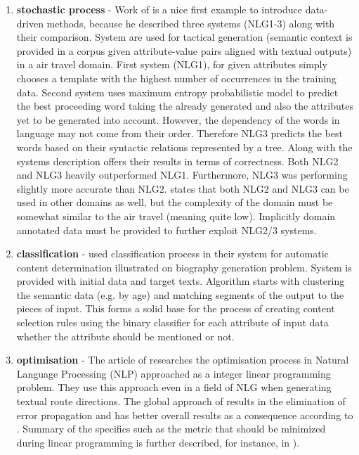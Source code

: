 \begin{enumerate}
	\item \textbf{stochastic process} - Work of \cite{ratnaparkhi2000trainable} is a nice first example to introduce data-driven methods, because he described three systems (NLG1-3) along with their comparison. System are used for tactical generation (semantic context is provided in a corpus given attribute-value pairs aligned with textual outputs) in a air travel domain. First system (NLG1), for given attributes simply chooses a template with the highest number of occurrences in the training data. Second system uses maximum entropy probabilistic model to predict the best proceeding  word taking the already generated and also the attributes yet to be generated into account. However, the dependency of the words in language may not come from their order. Therefore NLG3 predicts the best words based on their syntactic relations represented by a tree. Along with the systems description \cite{ratnaparkhi2000trainable} offers their results in terms of correctness. Both NLG2 and NLG3 heavily outperformed NLG1. Furthermore, NLG3 was performing slightly more accurate than NLG2.  \cite{ratnaparkhi2000trainable} states that both NLG2 and NLG3 can be used in other domains as well, but the complexity of the domain must be somewhat similar to the air travel (meaning quite low). Implicitly domain annotated data must be provided to further exploit NLG2/3 systems.\label{dd-1}
	\item \textbf{classification} - \cite{duboue2003statistical} used classification process in their system for automatic content determination illustrated on biography generation problem. System is provided with initial data and target texts. Algorithm starts with clustering the semantic data (e.g. by age) and matching segments of the output to the pieces of input. This forms a solid base for the process of creating content selection rules using the binary classifier for each attribute of input data whether the attribute should be mentioned or not.\label{dd-2}
	\item \textbf{optimisation} - The article of \cite{marciniak2005beyond} researches the optimisation process in Natural Language Processing (NLP) approached as a integer linear programming problem. They use this approach even in a field of NLG when generating textual route directions. The global approach of results in the elimination of error propagation and has better overall results as a consequence according to \cite{marciniak2005beyond}. Summary of the specifics such as the metric that should be minimized during linear programming is further described, for instance, in \cite{gatt2018survey}).\label{dd-3}

\end{enumerate}
